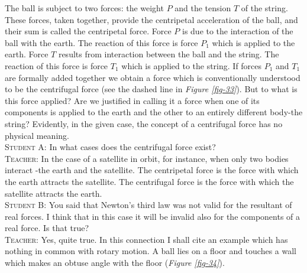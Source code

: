 \documentclass[a4paper,sfsidenotes]{tufte-book}
\begin{document}
The ball is subject to two forces: the weight $P$ and the tension $T$ of the string. These forces, taken together, provide the centripetal acceleration of the ball, and their sum is called the centripetal force. Force $P$ is due to the interaction of the ball with the earth. The reaction of this force is force $P_{1}$ which is applied to the earth. Force $T$ results from interaction between the ball and the string. The reaction of this force is force $T_{1}$ which is applied to the string. If forces $P_{1}$ and $T_{1}$ are formally added together we obtain a force which is conventionally understood to be the centrifugal force
(see the dashed line in \emph{Figure \ref{fig-33}}). But to what is this force applied? Are we justified in calling it a force when one of its components is applied to the earth and the other to an entirely different body-the string? Evidently, in the given case, the concept of a centrifugal force has no physical meaning.
\\
\textsc{Student A:} In what cases does the centrifugal force exist?
\\
\textsc{Teacher:} In the case of a satellite in orbit, for instance, when only two bodies interact -the earth and the satellite. The centripetal force is the force with which the earth attracts the satellite. The centrifugal force is the force with which the satellite attracts the earth.
\\
\textsc{Student B:} You said that Newton's third law was not valid for the resultant of real forces. I think that in this case it will be invalid also for the components of a real force. Is that true?
\\
\textsc{Teacher:} Yes, quite true. In this connection I shall cite an example which has nothing in common with rotary motion. A ball lies on a floor and touches a wall which makes an obtuse
angle with the floor (\emph{Figure \ref{fig-34}}). 
\end{document}
